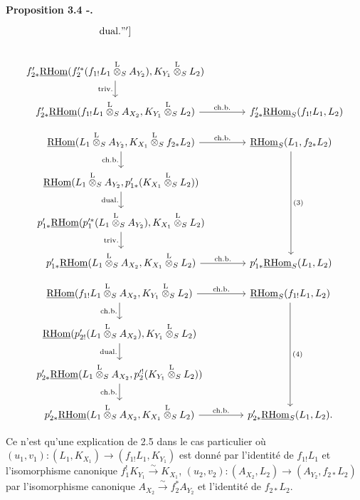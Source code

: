 \documentclass[11pt]{article}
\newenvironment{statement}[1]{\par\medskip\noindent\textbf{#1.}\ }{\par\medskip}
\newcommand{\R}{\mathrm{R}}\newcommand{\RHomCore}{\mathrm{RHom}}
\providecommand{\RHom}{\RHomCore}
\providecommand{\uRHom}{\underline{\RHom}}
\providecommand{\RHom}{\RHomCore}
\providecommand{\RHom}{\R\mathcal{H}om}
\providecommand{\R}{\mathrm R}
\providecommand{\RHom}{\RHomCore}
\begin{document}
\begin{statement}{Proposition 3.4 -}
\[\begin{tikzcd}[column sep=3.7em,row sep=1.7em]
\mathrm{dual.}"']
& \\
f'_{2*}\uRHom(f_2'^*(f_{1!}L_1\overset{\mathrm{L}}{\otimes}_S A_{Y_2}),K_{Y_1}\overset{\mathrm{L}}{\otimes}_S L_2) \arrow[d,"\mathrm{triv.}"']
& \\
f'_{2*}\uRHom(f_{1!}L_1\overset{\mathrm{L}}{\otimes}_S A_{X_2},K_{Y_1}\overset{\mathrm{L}}{\otimes}_S L_2) \arrow[r,"\mathrm{ch.b.}"]
& f'_{2*}\uRHom_S(f_{1!}L_1,L_2)
\end{tikzcd}
\]
\[
\begin{tikzcd}[column sep=3.7em,row sep=1.7em]
\uRHom(L_1\overset{\mathrm{L}}{\otimes}_S A_{Y_2},K_{X_1}\overset{\mathrm{L}}{\otimes}_S f_{2*}L_2)
  \arrow[r,"\mathrm{ch.b.}"] \arrow[d,"\mathrm{ch.b.}"']
& \uRHom_S(L_1,f_{2*}L_2) \arrow[ddd,"(3)"] \\
\uRHom(L_1\overset{\mathrm{L}}{\otimes}_S A_{Y_2},p'_{1*}(K_{X_1}\overset{\mathrm{L}}{\otimes}_S L_2)) \arrow[d,"\mathrm{dual.}"']
& \\
p'_{1*}\uRHom(p_1'^*(L_1\overset{\mathrm{L}}{\otimes}_S A_{Y_2}),K_{X_1}\overset{\mathrm{L}}{\otimes}_S L_2) \arrow[d,"\mathrm{triv.}"']
& \\
p'_{1*}\uRHom(L_1\overset{\mathrm{L}}{\otimes}_S A_{X_2},K_{X_1}\overset{\mathrm{L}}{\otimes}_S L_2) \arrow[r,"\mathrm{ch.b.}"]
& p'_{1*}\uRHom_S(L_1,L_2)
\end{tikzcd}
\]
\[
\begin{tikzcd}[column sep=3.7em,row sep=1.7em]
\uRHom(f_{1!}L_1\overset{\mathrm{L}}{\otimes}_S A_{X_2},K_{Y_1}\overset{\mathrm{L}}{\otimes}_S L_2)
  \arrow[r,"\mathrm{ch.b.}"] \arrow[d,"\mathrm{ch.b.}"']
& \uRHom_S(f_{1!}L_1,L_2) \arrow[ddd,"(4)"] \\
\uRHom(p'_{2!}(L_1\overset{\mathrm{L}}{\otimes}_S A_{X_2}),K_{Y_1}\overset{\mathrm{L}}{\otimes}_S L_2) \arrow[d,"\mathrm{dual.}"']
& \\
p'_{2*}\uRHom(L_1\overset{\mathrm{L}}{\otimes}_S A_{X_2},p_2'^!(K_{Y_1}\overset{\mathrm{L}}{\otimes}_S L_2)) \arrow[d,"\mathrm{ch.b.}"']
& \\
p'_{2*}\uRHom(L_1\overset{\mathrm{L}}{\otimes}_S A_{X_2},K_{X_1}\overset{\mathrm{L}}{\otimes}_S L_2) \arrow[r,"\mathrm{ch.b.}"]
& p'_{2*}\uRHom_S(L_1,L_2).
\end{tikzcd}
\]
\end{statement}
Ce n'est qu'une explication de 2.5 dans le cas particulier où $(u_1,v_1):(L_1,K_{X_1})\to(f_{1!}L_1,K_{Y_1})$ est donné par l'identité de $f_{1!}L_1$ et l'isomorphisme canonique $f_1^!K_{Y_1}\xrightarrow{\sim}K_{X_1}$, $(u_2,v_2):(A_{X_2},L_2)\to(A_{Y_2},f_{2*}L_2)$ par l'isomorphisme canonique $A_{X_2}\xrightarrow{\sim}f_2^*A_{Y_2}$ et l'identité de $f_{2*}L_2$.
\end{document}
